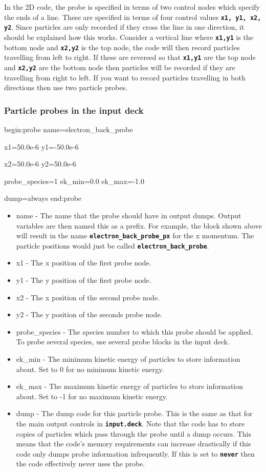 \documentclass[12pt,a4paper]{article}
\newcommand{\inlinecode}[1]{{\color{warwickred} \bf\texttt{#1}}}
\newenvironment{boxverbatim}{\lboxverbatim{none}}{\endlboxverbatim}
\begin{document}
In the 2D code, the probe is specified in terms of two control nodes which
specify the ends of a line. These are specified in terms of four control
values \inlinecode{x1, y1, x2, y2}. Since particles are only recorded if they
cross the line in one direction, it should be explained how this
works. Consider a vertical line where \inlinecode{x1,y1} is the bottom node
and \inlinecode{x2,y2} is the top node, the code will then record particles
travelling from left to right. If these are reversed so that
\inlinecode{x1,y1} are the top node and \inlinecode{x2,y2} are the bottom node
then particles will be recorded if they are travelling from right to left. If
you want to record particles travelling in both directions then use two
particle probes.

\subsubsection{Particle probes in the input deck}
\begin{boxverbatim}
begin:probe
   name=electron_back_probe

   x1=50.0e-6
   y1=-50.0e-6

   x2=50.0e-6
   y2=50.0e-6

   probe_species=1
   ek_min=0.0
   ek_max=-1.0

   dump=always
end:probe
\end{boxverbatim}
\begin{itemize}
\item name - The name that the probe should have in output dumps. Output
  variables are then named this as a prefix. For example, the block shown
  above will result in the name \inlinecode{electron\_back\_probe\_px} for
  the x momentum. The particle positions would just be called
  \inlinecode{electron\_back\_probe}.
\item x1 - The x position of the first probe node.
\item y1 - The y position of the first probe node.
\item x2 - The x position of the second probe node.
\item y2 - The y position of the seconds probe node.
\item probe\_species - The species number to which this probe should be
  applied. To probe several species, use several probe blocks in the input
  deck.
\item ek\_min - The minimum kinetic energy of particles to store information
  about. Set to 0 for no minimum kinetic energy.
\item ek\_max - The maximum kinetic energy of particles to store information
  about. Set to -1 for no maximum kinetic energy.
\item dump - The dump code for this particle probe. This is the same as that
  for the main output controls in \inlinecode{input.deck}. Note that the code
  has to store copies of particles which pass through the probe until a dump
  occurs. This means that the code's memory requirements can increase
  drastically if this code only dumps probe information infrequently. If this
  is set to \inlinecode{never} then the code effectively never uses the probe.
\end{itemize}
\end{document}
